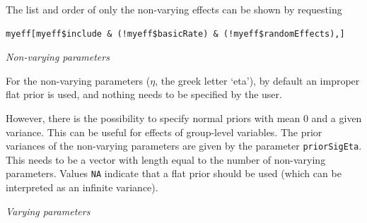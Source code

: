 \documentclass[a4paper,fleqn,11pt]{article}
\newcommand{\+}{\, + \,}
\begin{document}
\noindent
The list and order of only the non-varying effects
can be shown by requesting
{\small
\begin{verbatim}
myeff[myeff$include & (!myeff$basicRate) & (!myeff$randomEffects),]
\end{verbatim}
}
\medskip

\noindent
\emph{Non-varying parameters}
\smallskip

For the non-varying parameters ($\eta$, the greek letter `eta'),
by default an improper flat prior is used,
and nothing needs to be specified by the user.
\smallskip

However, there is the possibility to specify normal priors
with mean 0 and a given variance. This can be useful for effects
of group-level variables. The prior variances of the non-varying parameters
are given by the parameter \texttt{priorSigEta}.
This needs to be a vector with length equal to the number of
non-varying parameters.
Values \texttt{NA} indicate that a flat prior should be used
(which can be interpreted as an infinite variance).
\medskip

\noindent
\emph{Varying parameters}
\smallskip
\end{document}

